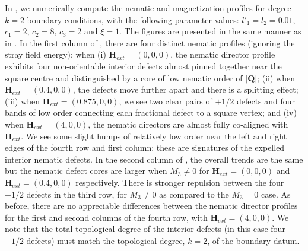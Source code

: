 \documentclass{article}
\def\Qvec{\mathbf{Q}}
\def\Hvec{\mathbf{H}}
\begin{document}
In , we numerically compute the nematic and magnetization profiles for degree $k=2$ boundary conditions, with the following parameter values: $l'_1=l_2=0.01$, $c_1=2$, $c_2=8$, $c_3=2$ and $\xi=1$. The figures are presented in the same manner as in .  In the first column of , there are four distinct nematic profiles (ignoring the stray field energy): when (i) $\Hvec_{ext} = \left(0, 0, 0\right)$, the nematic director profile exhibits four non-orientable interior defects almost pinned together near the square centre and distinguished by a core of low nematic order of $|\Qvec|$; (ii) when $\Hvec_{ext} = \left(0.4, 0, 0\right)$, the defects move further apart and there is a splitting effect; (iii) when $\Hvec_{ext}=\left(0.875, 0, 0\right)$, we see two clear pairs of $+1/2$ defects and four bands of low order connecting each fractional defect to a square vertex; and (iv) when $\Hvec_{ext}=\left(4, 0, 0\right)$, the nematic directors are almost fully co-aligned with $\Hvec_{ext}$. We see some slight humps of relatively low order near the left and right edges of the fourth row and first column; these are signatures of the expelled interior nematic defects. In the second column of , the overall trends are the same but the nematic defect cores are larger when $M_3 \neq 0$ for $\Hvec_{ext} = (0,0,0)$ and $\Hvec_{ext} = (0.4,0,0)$ respectively. There is stronger repulsion between the four $+1/2$ defects in the third row, for $M_3 \neq 0$ as compared to the $M_3=0$ case. As before, there are no appreciable differences between the nematic director profiles for the first and second columns of the fourth row, with $\Hvec_{ext}=(4,0,0)$. We note that the total topological degree of the interior defects (in this case four $+1/2$ defects) must match the topological degree, $k=2$, of the boundary datum. 
\end{document}
